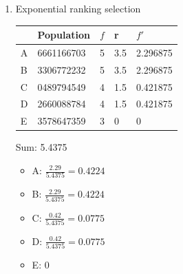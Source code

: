 \documentclass{article}
\begin{document}
\begin{enumerate}
    \pagebreak
    \item Exponential ranking selection
    \begin{table}[h]
        \centering
        \begin{tabular}{l|l|l|l|l}
            & Population & $f$ & r & $f'$ \\
            \hline
            A & 6661166703  & 5 & 3.5 & 2.296875\\
            B & 3306772232  & 5 & 3.5 & 2.296875\\
            C & 0489794549  & 4 & 1.5 & 0.421875\\
            D & 2660088784  & 4 & 1.5 & 0.421875\\
            E & 3578647359  & 3 & 0 & 0
        \end{tabular}
    \end{table}
    Sum: 5.4375
    \begin{itemize}
        \item A: $\frac{2.29}{5.4375} = 0.4224$
        \item B: $\frac{2.29}{5.4375} = 0.4224$
        \item C: $\frac{0.42}{5.4375} = 0.0775$
        \item D: $\frac{0.42}{5.4375} = 0.0775$
        \item E: 0
    \end{itemize}



\end{enumerate}
\end{document}
